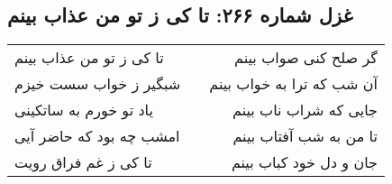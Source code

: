 \begin{center}
\section*{غزل شماره ۲۶۶: تا کی ز تو من عذاب بینم}
\label{sec:266}
\begin{longtable}{l p{0.5cm} r}
تا کی ز تو من عذاب بینم
&&
گر صلح کنی صواب بینم
\\
شبگیر ز خواب سست خیزم
&&
آن شب که ترا به خواب بینم
\\
یاد تو خورم به ساتکینی
&&
جایی که شراب ناب بینم
\\
امشب چه بود که حاضر آیی
&&
تا من به شب آفتاب بینم
\\
تا کی ز غم فراق رویت
&&
جان و دل خود کباب بینم
\\
\end{longtable}
\end{center}
